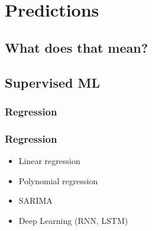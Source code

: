 



\begin{frame}
   \titlepage
\end{frame}



\begin{frame}
   \tableofcontents
\end{frame}

\section{Predictions}


\subsection{What does that mean?}



\subsection{Supervised ML}

\subsubsection{Regression}

\begin{frame}\frametitle{Regression}
   \begin{itemize}
      \item Linear regression
      \item Polynomial regression
      \item SARIMA
      \item Deep Learning (RNN, LSTM)
   \end{itemize}
\end{frame}


